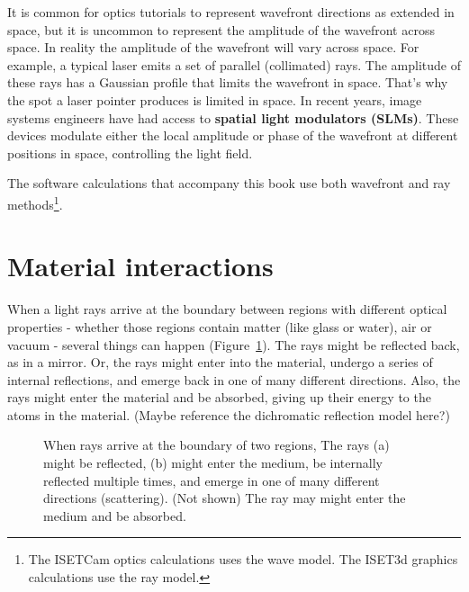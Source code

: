 \documentclass[
  letterpaper,
]{book}
\begin{document}
It is common for optics tutorials to represent wavefront directions as
extended in space, but it is uncommon to represent the amplitude of the
wavefront across space. In reality the amplitude of the wavefront will
vary across space. For example, a typical laser emits a set of parallel
(collimated) rays. The amplitude of these rays has a Gaussian profile
that limits the wavefront in space. That's why the spot a laser pointer
produces is limited in space. In recent years, image systems engineers
have had access to \textbf{spatial light modulators (SLMs)}. These
devices modulate either the local amplitude or phase of the wavefront at
different positions in space, controlling the light field.

The software calculations that accompany this book use both wavefront
and ray methods\footnote{The ISETCam optics calculations uses the wave
  model. The ISET3d graphics calculations use the ray model.}.

\section{Material interactions}\label{material-interactions}

When a light rays arrive at the boundary between regions with different
optical properties - whether those regions contain matter (like glass or
water), air or vacuum - several things can happen
(Figure~\ref{fig-reflected-scattered}). The rays might be reflected
back, as in a mirror. Or, the rays might enter into the material,
undergo a series of internal reflections, and emerge back in one of many
different directions. Also, the rays might enter the material and be
absorbed, giving up their energy to the atoms in the material. (Maybe
reference the dichromatic reflection model here?)

\begin{figure}


\caption{\label{fig-reflected-scattered}When rays arrive at the boundary
of two regions, The rays (a) might be reflected, (b) might enter the
medium, be internally reflected multiple times, and emerge in one of
many different directions (scattering). (Not shown) The ray may might
enter the medium and be absorbed.}

\end{figure}%
\end{document}
